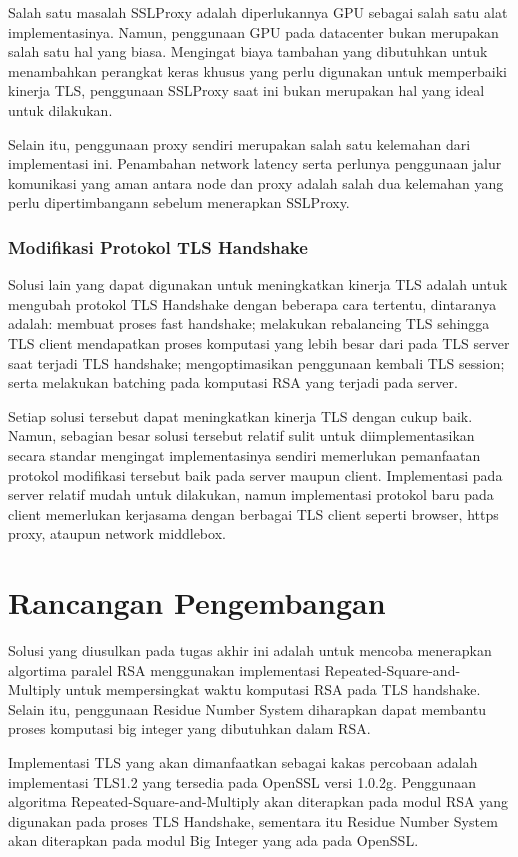     Salah satu masalah SSLProxy adalah diperlukannya GPU sebagai salah satu alat implementasinya. Namun, penggunaan GPU pada datacenter bukan merupakan salah satu hal yang biasa. Mengingat biaya tambahan yang dibutuhkan untuk menambahkan perangkat keras khusus yang perlu digunakan untuk memperbaiki kinerja TLS, penggunaan SSLProxy saat ini bukan merupakan hal yang ideal untuk dilakukan.

    Selain itu, penggunaan proxy sendiri merupakan salah satu kelemahan dari implementasi ini. Penambahan network latency serta perlunya penggunaan jalur komunikasi yang aman antara node dan proxy adalah salah dua kelemahan yang perlu dipertimbangann sebelum menerapkan SSLProxy.


    \subsubsection{Modifikasi Protokol TLS Handshake}
    Solusi lain yang dapat digunakan untuk meningkatkan kinerja TLS adalah untuk mengubah protokol TLS Handshake dengan beberapa cara tertentu, dintaranya adalah: membuat proses fast handshake; melakukan rebalancing TLS sehingga TLS client mendapatkan proses komputasi yang lebih besar dari pada TLS server saat terjadi TLS handshake; mengoptimasikan penggunaan kembali TLS session; serta melakukan batching pada komputasi RSA yang terjadi pada server.

    Setiap solusi tersebut dapat meningkatkan kinerja TLS dengan cukup baik. Namun, sebagian besar solusi tersebut relatif sulit untuk diimplementasikan secara standar mengingat implementasinya sendiri memerlukan pemanfaatan protokol modifikasi tersebut baik pada server maupun client. Implementasi pada server relatif mudah untuk dilakukan, namun implementasi protokol baru pada client memerlukan kerjasama dengan berbagai TLS client seperti browser, https proxy, ataupun network middlebox.

\section{Rancangan Pengembangan}
Solusi yang diusulkan pada tugas akhir ini adalah untuk mencoba menerapkan algortima paralel RSA menggunakan implementasi Repeated-Square-and-Multiply untuk mempersingkat waktu komputasi RSA pada TLS handshake. Selain itu, penggunaan Residue Number System diharapkan dapat membantu proses komputasi big integer yang dibutuhkan dalam RSA.

Implementasi TLS yang akan dimanfaatkan sebagai kakas percobaan adalah implementasi TLS1.2 yang tersedia pada OpenSSL versi 1.0.2g. Penggunaan algoritma Repeated-Square-and-Multiply akan diterapkan pada modul RSA yang digunakan pada proses TLS Handshake, sementara itu Residue Number System akan diterapkan pada modul Big Integer yang ada pada OpenSSL.

